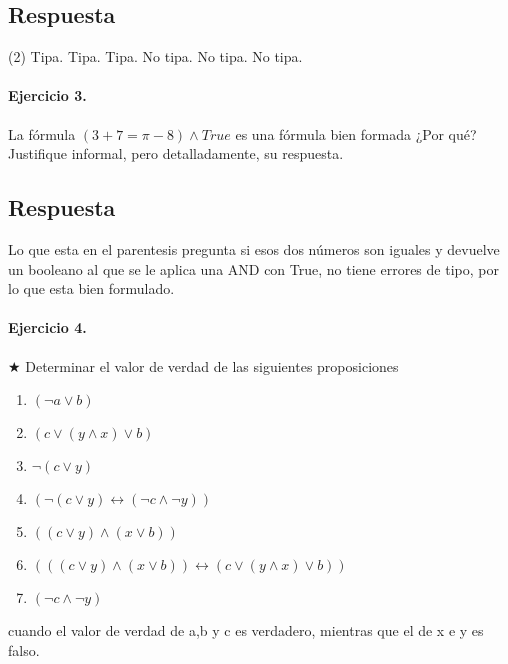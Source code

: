 \documentclass[a4paper]{article}
\begin{document}
\subsection*{Respuesta}

\begin{tasks}(2)
	\task Tipa.
	\task[d)] Tipa.
	\task Tipa.
	\task[e)] No tipa.
	\task No tipa.
	\task[f)] No tipa.
\end{tasks}

\paragraph{\textbf{Ejercicio 3.}} La fórmula $ (3+7= \pi -8) \wedge True $ es una fórmula bien formada ¿Por qué? Justifique informal, pero detalladamente, su respuesta.

\subsection*{Respuesta}

Lo que esta en el parentesis pregunta si esos dos números son iguales y devuelve un booleano al que se le aplica una AND con True, no tiene errores de tipo, por lo que esta bien formulado.

\paragraph{\textbf{Ejercicio 4.}} $\bigstar$ Determinar el valor de verdad de las siguientes proposiciones

\begin{multicols}{2}
\begin{enumerate}[label=\alph*)]
	\item $ ( \neg a \vee b) $
	\item $ (c \vee (y \wedge x) \vee b) $
	\item $ \neg (c \vee y) $
	\item $ (\neg(c \vee y) \leftrightarrow (\neg c \wedge \neg y)) $
	\item $ ((c \vee y) \wedge (x \vee b)) $
	\item $ (((c \vee y) \wedge (x \vee b)) \leftrightarrow (c \vee (y \wedge x)\vee b)) $
	\item $ (\neg c \wedge \neg y)$
\end{enumerate}
\end{multicols}

cuando el valor de verdad de a,b y c es verdadero, mientras que el de x e y es falso.
\end{document}
